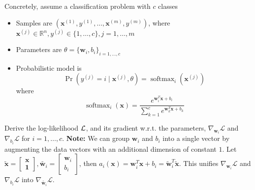 \documentclass{article}
\newcommand{\R}{\mathbb{R}}
\newcommand{\x}{\bf{x}}
\newcommand{\w}{\bf{w}}
\DeclareMathOperator{\sm}{softmax}
\renewcommand{\bf}[1]{\textbf{{#1}}}
\begin{document}
\begin{enumerate}
            Concretely, assume a classification problem with $c$ classes
            \begin{itemize}
                \item Samples are $(\x^{(1)}, y^{(1)}, \ldots, \x^{(m)}, y^{(m)})$, where 
                    $\x^{(j)} \in \R^n, y^{(j)} \in \{1, \ldots, c\}, j = 1, \ldots, m$
                \item Parameters are $\theta = \{\w_{i}, b_i\}_{i = 1, \ldots, c}$
                \item Probabilistic model is
                    \[\Pr \left( y^{(j)} = i \mid \x^{(j)}, \theta \right) = \sm_i(\x^{(j)})\]
                    where
                    \[\sm_i (\x) = \frac{e^{\w^{T}_{i} \x + b_i}}{\sum^{c}_{k = 1} e^{\w^{T}_{k} \x + b_k}}\]
            \end{itemize}
            Derive the log-likelihood $\cal{L}$, and its gradient w.r.t. the parameters,
            $\nabla_{\w_i} \mathcal{L}$ and $\nabla_{b_i} \mathcal{L}$ for $i = 1, \ldots, c$.
            \newline 
            \bf{Note:} We can group $\w_i$ and $b_i$ into a single vector by augmenting the data vectors
            with an additional dimension of constant $1$. Let $\tilde{\x} = \begin{bmatrix} \x \\ \bf{1} \end{bmatrix},
            \tilde{\w_i} = \begin{bmatrix} \w_i \\ b_i \end{bmatrix}$, then 
            $a_i(\x) = \w^{T}_{i} \x + b_i = \tilde{\w}^{T}_{i} \tilde{\x}$. This unifies
            $\nabla_{\w_i} \mathcal{L}$ and $\nabla_{b_i} \mathcal{L}$ into $\nabla_{\tilde{\w_i}} \mathcal{L}$.
            

\end{enumerate}
\end{document}
